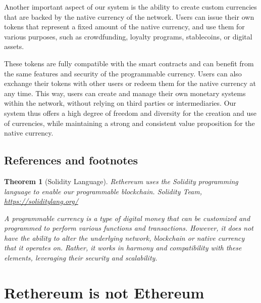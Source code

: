 \documentclass[a4paper,onecolumn, superscriptaddress,10pt,accepted=2020-05-01,issue=1, volume=2, shorttitle=papers]{compositionalityarticle}
\newtheorem{theorem}{Theorem}
\begin{document}
\vspace{0.3cm}

Another important aspect of our system is the ability to create custom currencies that are backed by the native currency of the network. Users can issue their own tokens that represent a fixed amount of the native currency, and use them for various purposes, such as crowdfunding, loyalty programs, stablecoins, or digital assets. 

\vspace{0.3cm}

These tokens are fully compatible with the smart contracts and can benefit from the same features and security of the programmable currency. Users can also exchange their tokens with other users or redeem them for the native currency at any time. This way, users can create and manage their own monetary systems within the network, without relying on third parties or intermediaries. Our system thus offers a high degree of freedom and diversity for the creation and use of currencies, while maintaining a strong and consistent value proposition for the native currency.

\vspace{0.5cm}


\subsection{References and footnotes}
\label{sec:subsec1}

\begin{theorem}[Solidity Language]
  Rethereum uses the Solidity programming language to enable our programmable blockchain.
   Solidity Team,
  \href{https://soliditylang.org/}
       {https://soliditylang.org/}
\end{theorem}

\footnotesize{\textit{A programmable currency is a type of digital money that can be customized and 
programmed to perform various functions and transactions. However, it does not 
have the ability to alter the underlying network, blockchain or native 
currency that it operates on. Rather, it works in harmony and compatibility 
with these elements, leveraging their security and scalability.}}


\newpage

\section{Rethereum is not Ethereum}
\end{document}
